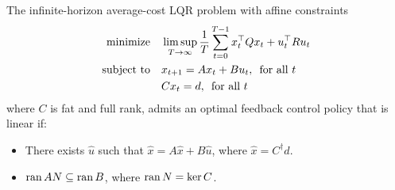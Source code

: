 \documentclass[12pt]{article}
\begin{document}
\begin{theorem}
  The infinite-horizon average-cost LQR problem with affine constraints
  \begin{align*}
    \text{minimize}
      &\quad \limsup_{T \to \infty} \frac{1}{T} \sum_{t = 0}^{T - 1}
        x_t ^\top Q x_t + u_t ^\top R u_t \\
    \text{subject to}
      &\quad x_{t + 1} = A x_t + B u_t, \enskip \text{for all \(t\)} \\
      &\quad C x_t = d, \enskip \text{for all \(t\)}
  \end{align*}
  where \(C\) is fat and full rank,
  admits an optimal feedback control policy that is linear if:
  \begin{itemize}
    \item There exists \(\hat{u}\) such that
      \(\hat{x} = A \hat{x} + B \hat{u}\), where
      \(\hat{x} = C^\dagger d\).

    \item \(\operatorname{ran} AN \subseteq \operatorname{ran} B\),
      where \(\operatorname{ran} N = \operatorname{ker} C\).
  \end{itemize}
\end{theorem}
\end{document}
